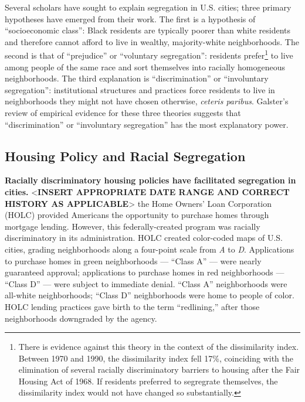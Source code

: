 \documentclass[paper=letter, fontsize=12pt]{scrartcl} %
\begin{document}
Several scholars have sought to explain segregation in U.S. cities; three primary hypotheses have emerged from their work. The first is a hypothesis of ``socioeconomic class'': Black residents are typically poorer than white residents and therefore cannot afford to live in wealthy, majority-white neighborhoods. The second is that of ``prejudice'' or ``voluntary segregation'': residents prefer\footnote{There is evidence against this theory in the context of the dissimilarity index. Between 1970 and 1990, the dissimilarity index fell 17\%, coinciding with the elimination of several racially discriminatory barriers to housing after the Fair Housing Act of 1968. \cite{goering2} If residents preferred to segregrate themselves, the dissimilarity index would not have changed so substantially.} to live among people of the same race and sort themselves into racially homogeneous neighborhoods. The third explanation is ``discrimination'' or ``involuntary segregation'': institutional structures and practices force residents to live in neighborhoods they might not have chosen otherwise, \textit{ceteris paribus}. Galster's review of empirical evidence for these three theories suggests that ``discrimination'' or ``involuntary segregation'' has the most explanatory power. \cite{goering}

\subsection{Housing Policy and Racial Segregation}
\textbf{Racially discriminatory housing policies have facilitated segregation in cities.} <\textbf{INSERT APPROPRIATE DATE RANGE AND CORRECT HISTORY AS APPLICABLE}> the Home Owners' Loan Corporation (HOLC) provided Americans the opportunity to purchase homes through mortgage lending. However, this federally-created program was racially discriminatory in its administration. HOLC created color-coded maps of U.S. cities, grading neighborhoods along a four-point scale from \textit{A} to \textit{D}. Applications to purchase homes in green neighborhoods --- ``Class A'' --- were nearly guaranteed approval; applications to purchase homes in red neighborhoods --- ``Class D'' --- were subject to immediate denial. ``Class A'' neighborhoods were all-white neighborhoods; ``Class D'' neighborhoods were home to people of color. HOLC lending practices gave birth to the term ``redlining,'' after those neighborhoods downgraded by the agency. \cite{rothstein}\par
\end{document}

